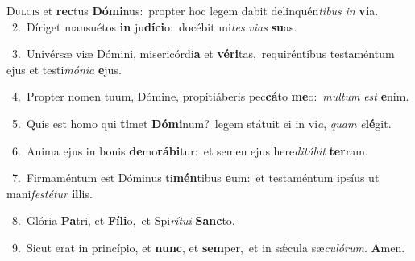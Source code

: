 \lettrine{\initial\textcolor{\initialcolor}{D}}{ulcis} et \textbf{rec}\-tus \textbf{Dó}\-\textbf{mi}nus:~\star propter hoc legem dabit delinquén\-\textit{ti}\-\textit{bus} \textit{in} \textbf{vi}\-a.\\
{\numbfont\textcolor{\numbcolor}{~2.}}~Díriget mansuétos \textbf{in} ju\-\textbf{dí}\-\textbf{ci}o:~\star docébit mi\textit{tes} \textit{vi}\-\textit{as} \textbf{su}\-as.\par
{\numbfont\textcolor{\numbcolor}{~3.}}~Univérsæ viæ Dómini, misericórdi\textbf{a} et \textbf{vé}\-\textbf{ri}tas,~\star requiréntibus testaméntum ejus et testi\-\textit{mó}\-\textit{ni}\textit{a} \textbf{e}\-jus.\par
{\numbfont\textcolor{\numbcolor}{~4.}}~Propter nomen tuum, Dómine, propitiáberis pec\-\textbf{cá}\-to \textbf{me}\-o:~\star \textit{mul}\-\textit{tum} \textit{est} \textbf{e}\-nim.\par
{\numbfont\textcolor{\numbcolor}{~5.}}~Quis est homo qui \textbf{ti}\-met \textbf{Dó}\-\textbf{mi}num?~\star legem státuit ei in vi\-\textit{a}\-, \textit{quam} \textit{e}\-\textbf{lé}git.\par
{\numbfont\textcolor{\numbcolor}{~6.}}~Anima ejus in bonis \textbf{de}\-mo\-\textbf{rá}\-\textbf{bi}tur:~\star et semen ejus here\-\textit{di}\-\textit{tá}\textit{bit} \textbf{ter}\-ram.\par
{\numbfont\textcolor{\numbcolor}{~7.}}~Firmaméntum est Dóminus ti\-\textbf{mén}\-tibus \textbf{e}\-um:~\star et testaméntum ipsíus ut mani\-\textit{fes}\-\textit{té}\textit{tur} \textbf{il}\-lis.\par
{\numbfont\textcolor{\numbcolor}{~8.}}~Glória \textbf{Pa}\-tri, et \textbf{Fí}\-\textbf{li}o,~\star et Spi\-\textit{rí}\-\textit{tu}\textit{i} \textbf{Sanc}\-to.\par
{\numbfont\textcolor{\numbcolor}{~9.}}~Sicut erat in princípio, et \textbf{nunc}\-, et \textbf{sem}\-per,~\star et in sǽcula sæ\-\textit{cu}\-\textit{ló}\textit{rum}. \textbf{A}\-men.\par
